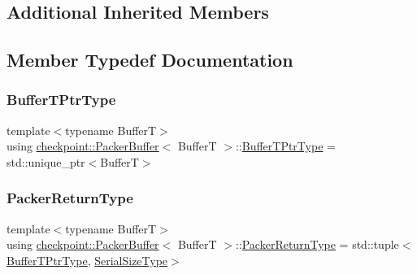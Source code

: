 \subsection*{Additional Inherited Members}


\subsection{Member Typedef Documentation}
\mbox{\label{structcheckpoint_1_1_packer_buffer_a081ec628050e8b173e413271fa070c26}} 
\subsubsection{\texorpdfstring{Buffer\+T\+Ptr\+Type}{BufferTPtrType}}
{\footnotesize\ttfamily template$<$typename BufferT$>$ \\
using \hyperlink{structcheckpoint_1_1_packer_buffer}{checkpoint\+::\+Packer\+Buffer}$<$ BufferT $>$\+::\hyperlink{structcheckpoint_1_1_packer_buffer_a081ec628050e8b173e413271fa070c26}{Buffer\+T\+Ptr\+Type} =  std\+::unique\+\_\+ptr$<$BufferT$>$}

\mbox{\label{structcheckpoint_1_1_packer_buffer_ad7b75618e01af437ab75a4099c2cf696}} 
\subsubsection{\texorpdfstring{Packer\+Return\+Type}{PackerReturnType}}
{\footnotesize\ttfamily template$<$typename BufferT$>$ \\
using \hyperlink{structcheckpoint_1_1_packer_buffer}{checkpoint\+::\+Packer\+Buffer}$<$ BufferT $>$\+::\hyperlink{structcheckpoint_1_1_packer_buffer_ad7b75618e01af437ab75a4099c2cf696}{Packer\+Return\+Type} =  std\+::tuple$<$\hyperlink{structcheckpoint_1_1_packer_buffer_a081ec628050e8b173e413271fa070c26}{Buffer\+T\+Ptr\+Type}, \hyperlink{namespacecheckpoint_a083f6674da3f94c2901b18c6d238217c}{Serial\+Size\+Type}$>$}



